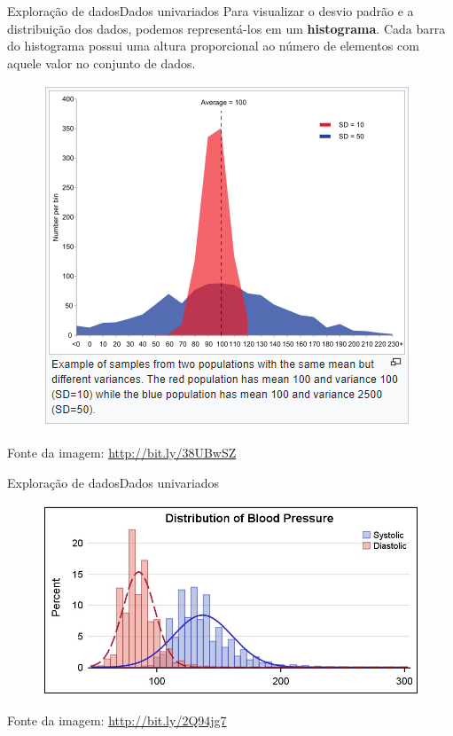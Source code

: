 \documentclass[t]{beamer}
\begin{document}
\begin{ftst}{Exploração de dados}{Dados univariados}
\footnotesize
\justifying
Para visualizar o desvio padrão e a distribuição dos dados, podemos representá-los em um \textbf{histograma}. Cada barra do histograma possui uma altura proporcional ao número de elementos com aquele valor no conjunto de dados.

\begin{figure}[h]
    \includegraphics[scale=0.4]{Figuras/slide01_06.png}
\end{figure}

\scriptsize
Fonte da imagem: \href{http://bit.ly/38UBwSZ}{http://bit.ly/38UBwSZ}


\end{ftst}


\begin{ftst}{Exploração de dados}{Dados univariados}
\vone
\begin{figure}[h]
    \includegraphics[scale=0.4]{Figuras/slide01_07.jpg}
\end{figure}
\vone
\vone
\vone
\vone
\vone
\scriptsize
Fonte da imagem: \href{http://bit.ly/2Q94jg7}{http://bit.ly/2Q94jg7}
\end{ftst}
\end{document}
